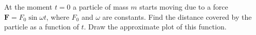 \item At the moment \( t = 0 \) a particle of mass \( m \) starts moving due to a force \( \mathbf{F} = F_0 \sin \omega t \), where \( F_0 \) and \(\omega\) are constants. Find the distance covered by the particle as a function of \( t \). Draw the approximate plot of this function.
    \begin{center}
    \end{center}